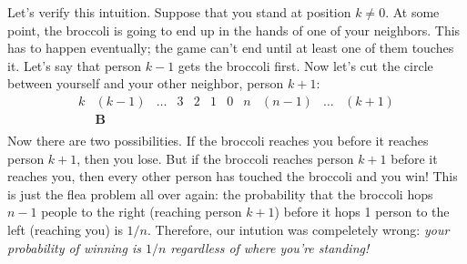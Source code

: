 Let's verify this intuition.  Suppose that you stand at position $k
\neq 0$.  At some point, the broccoli is going to end up in the hands
of one of your neighbors.  This has to happen eventually; the game
can't end until at least one of them touches it.  Let's say that
person $k - 1$ gets the broccoli first.  Now let's cut the circle
between yourself and your other neighbor, person $k+1$:
%
\[
\begin{array}{cccccccccccccc}
k & (k-1) & \ldots & 3 & 2 & 1 & 0 & n & (n-1) & \ldots & (k+1) \\
  & \mathbf{B} \\
\end{array}
\]
%
Now there are two possibilities.  If the broccoli reaches you before
it reaches person $k+1$, then you lose.  But if the broccoli reaches
person $k+1$ before it reaches you, then every other person has
touched the broccoli and you win!  This is just the flea problem all
over again: the probability that the broccoli hops $n-1$ people to the
right (reaching person $k+1$) before it hops 1 person to the left
(reaching you) is $1 / n$.  Therefore, our intution was compeletely
wrong: \textit{your probability of winning is $1 / n$ regardless of
where you're standing!}


\endinput
